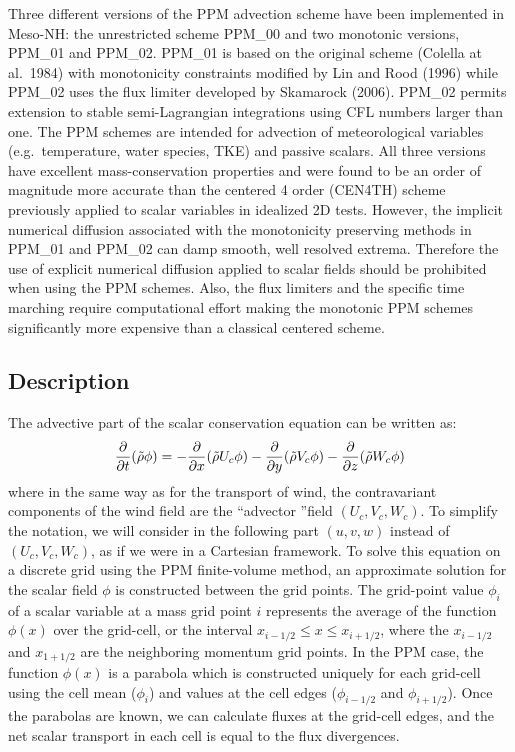   Three different versions of the PPM advection scheme have been
  implemented in Meso-NH: the unrestricted scheme PPM\_00 and two monotonic
  versions, PPM\_01 and PPM\_02. PPM\_01 is based on the original scheme (Colella at al.\ 1984)
  with monotonicity constraints modified by Lin and Rood (1996) while
  PPM\_02 uses the flux limiter developed by Skamarock (2006).
  PPM\_02 permits extension to stable semi-Lagrangian integrations
  using CFL numbers larger than one. 
  The PPM schemes are intended for advection of meteorological
  variables (e.g.\ temperature, water species, TKE) and passive
  scalars. All three versions have excellent mass-conservation properties
  and were found to be an order of magnitude more accurate than the
  centered 4 order (CEN4TH) scheme previously applied to scalar variables in idealized
  2D tests. However, the implicit numerical diffusion associated with the
  monotonicity preserving methods in PPM\_01 and PPM\_02 can damp
  smooth, well resolved extrema. Therefore the use of explicit numerical diffusion
  applied to scalar fields should be prohibited when using the PPM schemes.
  Also, the flux limiters and the
  specific time marching require computational effort
  making the monotonic PPM schemes significantly more expensive than a classical centered scheme. 

  \subsection{Description}

  The advective part of the scalar conservation equation can be written
  as:  
  \begin{equation}
    \label{advection}
    \frac{\partial}{\partial t}(\tilde{\rho} \phi) =
    - \frac{\partial}{\partial x}(\tilde{\rho} U_c \phi)
    - \frac{\partial}{\partial y}(\tilde{\rho} V_c \phi)
    - \frac{\partial}{\partial z}(\tilde{\rho} W_c \phi)    
  \end{equation}
  where in the same way as for the transport of wind, the contravariant components of the wind field are the \textquotedblleft advector \textquotedblright field $(U_c,V_c,W_c)$. To simplify the notation, we will consider in the following part $(u,v,w)$ instead of $(U_c,V_c,W_c)$, as if we were in a Cartesian framework. To solve this
  equation on a discrete grid using the PPM finite-volume method, an
  approximate solution for the scalar field $\phi$ is constructed
  between the grid points. The grid-point value $\phi_{i}$ of a scalar
  variable at a mass grid point $i$ represents the average of the
  function $\phi(x)$ over the grid-cell, or the interval $x_{i-1/2} \le
  x \le x_{i+1/2}$, where the $x_{i-1/2}$ and $x_{1+1/2}$ are the
  neighboring momentum grid points. In the PPM case, the function
  $\phi(x)$ is a parabola which is constructed uniquely for each
  grid-cell using the cell mean ($\phi_{i}$) and values at the cell
  edges ($\phi_{i-1/2}$ and $\phi_{i+1/2}$).  Once the parabolas are
  known, we can calculate fluxes at the grid-cell edges, and the net
  scalar transport in each cell is equal to the flux divergences.

